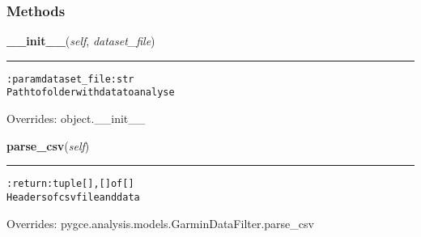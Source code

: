   \subsubsection{Methods}

    \vspace{0.5ex}

\hspace{.8\funcindent}\begin{boxedminipage}{\funcwidth}

    \raggedright \textbf{\_\_init\_\_}(\textit{self}, \textit{dataset\_file})

    \vspace{-1.5ex}

    \rule{\textwidth}{0.5\fboxrule}
\setlength{\parskip}{2ex}
\begin{alltt}

:param dataset\_file: str
    Path to folder with data to analyse
\end{alltt}

\setlength{\parskip}{1ex}
      Overrides: object.\_\_init\_\_

    \end{boxedminipage}

    \vspace{0.5ex}

\hspace{.8\funcindent}\begin{boxedminipage}{\funcwidth}

    \raggedright \textbf{parse\_csv}(\textit{self})

    \vspace{-1.5ex}

    \rule{\textwidth}{0.5\fboxrule}
\setlength{\parskip}{2ex}
\begin{alltt}

:return: tuple [], [] of []
    Headers of csv file and data
\end{alltt}

\setlength{\parskip}{1ex}
      Overrides: pygce.analysis.models.GarminDataFilter.parse\_csv

    \end{boxedminipage}

    \label{pygce:analysis:models:TimelineDataAnalysis:show_correlation_matrix_of_data}

